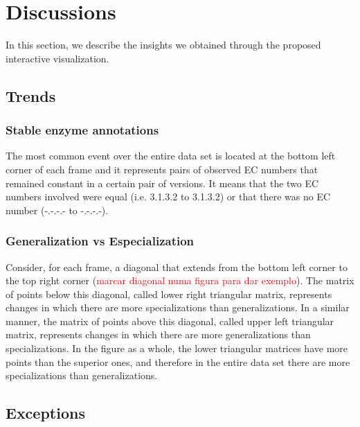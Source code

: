 \section{Discussions}

In this section, we describe the insights we obtained through the proposed interactive visualization.

\subsection{Trends}

\subsubsection{Stable enzyme annotations}

The most common event over the entire data set is located at the bottom left corner of each frame and it represents pairs of observed EC numbers that remained constant in a certain pair of versions. It means that the two EC numbers involved were equal (i.e. 3.1.3.2 to 3.1.3.2) or that there was no EC number (-.-.-.- to -.-.-.-).


\subsubsection{Generalization vs Especialization}

Consider, for each frame, a diagonal that extends from the bottom left corner to the top right corner (\textcolor{red}{marcar diagonal numa figura para dar exemplo}). The matrix of points below this diagonal, called lower right triangular matrix, represents changes in which there are more specializations than generalizations. In a similar manner, the matrix of points above this diagonal, called upper left triangular matrix, represents changes in which there are more generalizations than specializations. In the figure as a whole, the lower triangular matrices have more points than the superior ones, and therefore in the entire data set there are more specializations than generalizations.

\subsection{Exceptions} 


